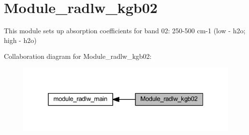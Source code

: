 \hypertarget{group__module__radlw__kgb02}{}\section{Module\+\_\+radlw\+\_\+kgb02}
\label{group__module__radlw__kgb02}


This module sets up absorption coefficients for band 02\+: 250-\/500 cm-\/1 (low -\/ h2o; high -\/ h2o)  


Collaboration diagram for Module\+\_\+radlw\+\_\+kgb02\+:\nopagebreak
\begin{figure}[H]
\begin{center}
\leavevmode
\includegraphics[width=325pt]{group__module__radlw__kgb02}
\end{center}
\end{figure}
